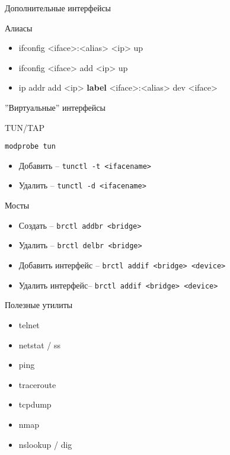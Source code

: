 \begin{frame}{Дополнительные интерфейсы}
	\begin{block}{Алиасы}
		\begin{itemize}
			\item ifconfig <iface>:<alias> <ip> up
			\item ifconfig <iface> add <ip> up
			\item ip addr add <ip> {\bf label} <iface>:<alias> dev <iface>
		\end{itemize}
	\end{block}
\end{frame}

\begin{frame}{''Виртуальные'' интерфейсы}
	\begin{block}{TUN/TAP}

		{\tt modprobe tun}

		\begin{itemize}
			\item Добавить -- {\tt tunctl -t <ifacename>}
			\item Удалить -- {\tt tunctl -d <ifacename>}
		\end{itemize}
	\end{block}
\end{frame}

\begin{frame}{Мосты}
	\begin{itemize}
		\item Создать -- {\tt brctl addbr <bridge>}
		\item Удалить -- {\tt brctl delbr <bridge>}
		\item Добавить интерфейс -- {\tt brctl addif <bridge> <device>}
		\item Удалить интерфейс-- {\tt brctl addif <bridge> <device>}
	\end{itemize}
\end{frame}

\begin{frame}{Полезные утилиты}

	\begin{itemize}
		\item telnet
		\item netstat / ss
		\item ping
		\item traceroute
		\item tcpdump
		\item nmap
		\item nslookup / dig
	\end{itemize}

\end{frame}

